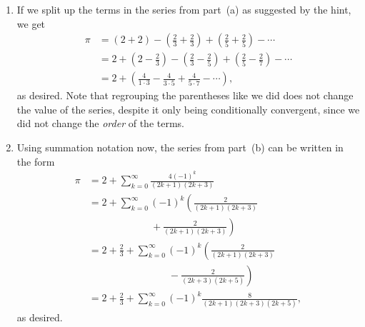 \begin{multicols}{2}
\begin{itemize}[leftmargin=0em]
\begin{enumerate}[leftmargin=1.5em,label=\bf\color{ocre}(\alph*)]
			\item If we split up the terms in the series from part~(a) as suggested by the hint, we get
			\begin{align*}
				\pi & = (2 + 2) - \left(\frac{2}{3} + \frac{2}{3}\right) + \left(\frac{2}{5} + \frac{2}{5}\right) - \cdots \\
				& = 2 + \left(2 - \frac{2}{3}\right) - \left(\frac{2}{3} - \frac{2}{5}\right) + \left(\frac{2}{5} - \frac{2}{7}\right) - \cdots \\
				& = 2 + \left(\frac{4}{1\cdot 3} - \frac{4}{3\cdot 5} + \frac{4}{5\cdot 7} - \cdots\right),
			\end{align*}
			as desired. Note that regrouping the parentheses like we did does not change the value of the series, despite it only being conditionally convergent, since we did not change the \emph{order} of the terms.
			
			\item Using summation notation now, the series from part~(b) can be written in the form
			\begin{align*}
				\pi & = 2 + \sum_{k=0}^\infty \frac{4(-1)^k}{(2k+1)(2k+3)} \\
				& = 2 + \sum_{k=0}^\infty (-1)^k\left(\frac{2}{(2k+1)(2k+3)}\right. \\
				& \qquad \qquad \qquad \ {} + \left.\frac{2}{(2k+1)(2k+3)}\right) \\
				& = 2 + \frac{2}{3} + \sum_{k=0}^\infty (-1)^k\left(\frac{2}{(2k+1)(2k+3)}\right. \\
				& \qquad \qquad \qquad \qquad {} - \left.\frac{2}{(2k+3)(2k+5)}\right) \\
				& = 2 + \frac{2}{3} + \sum_{k=0}^\infty (-1)^k\frac{8}{(2k+1)(2k+3)(2k+5)},
			\end{align*}
			as desired.
			

\end{enumerate}
\end{itemize}
\end{multicols}
